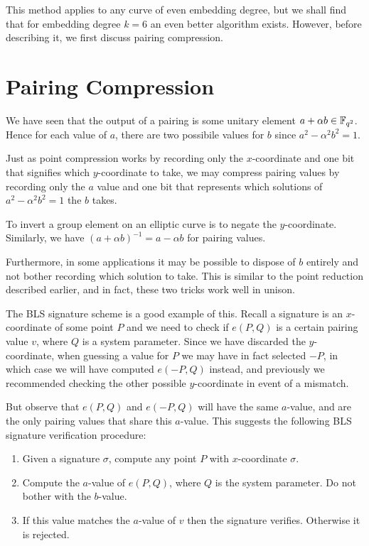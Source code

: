 This method applies to any curve of even embedding degree, but we shall
find that for embedding degree $k = 6$ an even better algorithm exists.
However, before describing it, we first discuss pairing compression.

\section {Pairing Compression}

We have seen that the output of a pairing is some unitary element
$a + \alpha b \in \mathbb{F}_{q^2}$.
Hence for each value of $a$, there are two possibile values for $b$
since $a^2 - \alpha^2 b^2 = 1$.

Just as point compression works by recording only the $x$-coordinate and
one bit that signifies which $y$-coordinate to take, we may compress pairing
values by recording only the $a$ value and one bit that represents which
solutions of $a^2 - \alpha^2 b^2 = 1$ the $b$ takes.

To invert a group element on an elliptic curve is to negate the $y$-coordinate.
Similarly, we have $(a + \alpha b)^{-1} = a - \alpha b$ for pairing values.

Furthermore, in some applications it may
be possible to dispose of $b$ entirely and not bother recording which solution
to take. This is similar to the point reduction described earlier, and
in fact, these two tricks work well in unison.

The BLS signature scheme is a good example of this.
Recall a signature is an $x$-coordinate of some point $P$ and we need to
check if $e(P, Q)$ is a certain pairing value $v$,
where $Q$ is a system parameter.
Since we have discarded the $y$-coordinate, when guessing a value for $P$
we may have in fact selected $-P$, in which case we will have computed
$e(-P, Q)$ instead, and previously we recommended checking the other possible
$y$-coordinate in event of a mismatch.

But observe that $e(P,Q)$ and $e(-P,Q)$ will have the same $a$-value,
and are the only pairing values that share this $a$-value.
This suggests the following BLS signature verification procedure:

\begin{enumerate}
\item
Given a signature $\sigma$, compute any point $P$ with $x$-coordinate $\sigma$.
\item
Compute the $a$-value of $e(P,Q)$, where $Q$ is the system parameter.
Do not bother with the $b$-value.
\item
If this value matches the $a$-value of $v$ then the signature verifies.
Otherwise it is rejected.
\end{enumerate}

